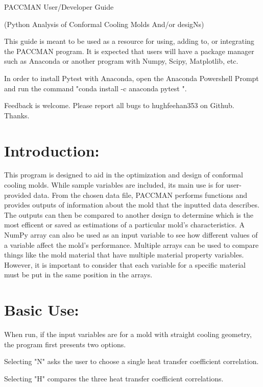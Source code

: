 \documentclass[a4paper,12pt]{article}
\begin{document}
\setlength{\parindent}{0em}
\doublespacing
\captionsetup{labelformat=empty}


\begin{center}
{\huge PACCMAN User/Developer Guide}

(Python Analysis of Conformal Cooling Molds And/or desigNs)
\end{center}

\bigskip

This guide is meant to be used as a resource for using, adding to, or integrating the PACCMAN program. 
It is expected that users will have a package manager such as Anaconda or another program with Numpy, Scipy, Matplotlib, etc.

\medskip

In order to install Pytest with Anaconda, open the Anaconda Powershell Prompt and run the command "conda install -c anaconda pytest ".

\medskip

Feedback is welcome. Please report all bugs to hughfeehan353 on Github. Thanks.

\section*{Introduction:}

This program is designed to aid in the optimization and design of conformal cooling molds. While sample variables are included, its main use is for user-provided data. From the chosen data file, PACCMAN performs functions and provides outputs of information about the mold that the inputted data describes. The outputs can then be compared to another design to determine which is the most efficent or saved as estimations of a particular mold's characteristics. A NumPy array can also be used as an input variable to see how different values of a  variable affect the mold's performance. Multiple arrays can be used to compare things like the mold material that have multiple material property variables. However, it is important to  consider that each variable for a specific material must be put in the same position in the arrays.

\clearpage

\section*{Basic Use:}

When run, if the input variables are for a mold with straight cooling geometry, the program first presents two options.
\begin{adjustwidth}{1cm}{}
Selecting "N" asks the user to choose a single heat transfer coefficient correlation.

Selecting "H" compares the three heat transfer coefficient correlations.
\end{adjustwidth}
\end{document}
